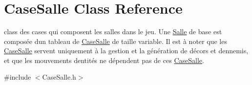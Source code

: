 \hypertarget{classCaseSalle}{}\section{Case\+Salle Class Reference}
\label{classCaseSalle}


class des cases qui composent les salles dans le jeu. Une \hyperlink{classSalle}{Salle} de base est composée d\textquotesingle{}un tableau de \hyperlink{classCaseSalle}{Case\+Salle} de taille variable. Il est à noter que les \hyperlink{classCaseSalle}{Case\+Salle} servent uniquement à la gestion et la génération de décors et d\textquotesingle{}ennemis, et que les mouvements d\textquotesingle{}entités ne dépendent pas de ces \hyperlink{classCaseSalle}{Case\+Salle}.  




{\ttfamily \#include $<$Case\+Salle.\+h$>$}

